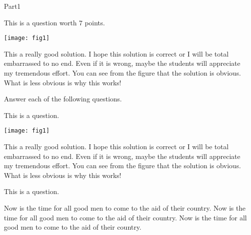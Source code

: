 \documentclass{article}
\begin{document}
\begin{exam}[Part I.]{Part1}
\begin{problem}[7]
This is a question worth $7$ points.

\begin{splitsolution}{1.25in}
\begin{panel}{1in}
\texttt{[image: fig1]}
\end{panel}
\begin{solution}
This a really good  solution. I hope this solution is correct or I will be total
embarrassed to no end. Even if it is wrong, maybe the students will appreciate
my tremendous effort. You can see from the figure that the solution is obvious.
What is less obvious is why this works!
\end{solution}
\end{splitsolution}
\end{problem}



\begin{problem*}[10ea]
Answer each of the following questions.
\begin{parts}
\item This is a question.


\begin{splitsolution}{\panelheight}
\begin{panel}[r]{\panelwidth}
\texttt{[image: fig1]}
\end{panel}
\begin{solution}
This a really good  solution. I hope this solution is correct or I will be total
embarrassed to no end. Even if it is wrong, maybe the students will appreciate
my tremendous effort. You can see from the figure that the solution is obvious.
What is less obvious is why this works!
\end{solution}
\end{splitsolution}

\item This is a question.
\begin{solution}[.75in]
Now is the time for all good men to come to the aid of their country.
Now is the time for all good men to come to the aid of their country.
Now is the time for all good men to come to the aid of their country.
\end{solution}
\end{parts}
\end{problem*}


\end{exam}
\end{document}
